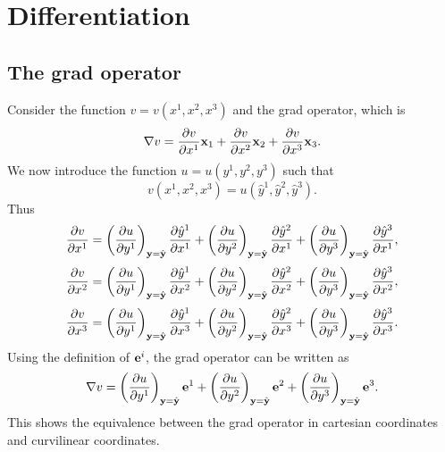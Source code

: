 \documentclass[11pt]{article}
\newcommand{\yhat}{\hat{y}}
\begin{document}
\section{Differentiation}
\subsection{The grad operator}
Consider the function $v = v(x^1, x^2, x^3)$ and the grad operator, which is  
\begin{equation}
    \nabla v = \frac{\partial v}{\partial x^1} \mathbf{x}_1 + \frac{\partial v}{\partial x^2} \mathbf{x}_2 + \frac{\partial v}{\partial x^3} \mathbf{x}_3.
\end{equation}
We now introduce the function $u = u(y^1,y^2,y^3)$ such that 
\begin{equation}
    v(x^1, x^2, x^3) = u(\yhat^1, \yhat^2, \yhat^3).
\end{equation}
Thus
\begin{equation}
    \frac{\partial v}{\partial x^1} 
    = \left( \frac{ \partial u}{\partial y^1} \right)_{\yvec = \hat{\yvec}} \frac{\partial \yhat^1}{\partial x^1} 
    + \left( \frac{ \partial u}{\partial y^2} \right)_{\yvec = \hat{\yvec}} \frac{\partial \yhat^2}{\partial x^1} 
    + \left( \frac{ \partial u}{\partial y^3} \right)_{\yvec = \hat{\yvec}} \frac{\partial \yhat^3}{\partial x^1}, 
\end{equation}
\begin{equation}
    \frac{\partial v}{\partial x^2} 
    = \left( \frac{ \partial u}{\partial y^1} \right)_{\yvec = \hat{\yvec}} \frac{\partial \yhat^1}{\partial x^2} 
    + \left( \frac{ \partial u}{\partial y^2} \right)_{\yvec = \hat{\yvec}} \frac{\partial \yhat^2}{\partial x^2} 
    + \left( \frac{ \partial u}{\partial y^3} \right)_{\yvec = \hat{\yvec}} \frac{\partial \yhat^3}{\partial x^2},
\end{equation}
\begin{equation}
    \frac{\partial v}{\partial x^3} 
    = \left( \frac{ \partial u}{\partial y^1} \right)_{\yvec = \hat{\yvec}} \frac{\partial \yhat^1}{\partial x^3} 
    + \left( \frac{ \partial u}{\partial y^2} \right)_{\yvec = \hat{\yvec}} \frac{\partial \yhat^2}{\partial x^3} 
    + \left( \frac{ \partial u}{\partial y^3} \right)_{\yvec = \hat{\yvec}} \frac{\partial \yhat^3}{\partial x^3} .
\end{equation}
Using the definition of $\mathbf{e}^i$, the grad operator can be written as
\begin{equation}
    \nabla v = \left ( \frac{\partial u }{\partial y^1} \right )_{\mathbf{y} = \hat{\mathbf{y}}} \mathbf{e}^1 + \left ( \frac{\partial u }{\partial y^2} \right )_{\mathbf{y} = \hat{\mathbf{y}}} \mathbf{e}^2 + \left ( \frac{\partial u }{\partial y^3} \right )_{\mathbf{y} = \hat{\mathbf{y}}} \mathbf{e}^3 .
\end{equation}
This shows the equivalence between the grad operator in cartesian coordinates and curvilinear coordinates.
\end{document}
